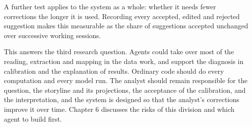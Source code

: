 A further test applies to the system as a whole: whether it needs fewer corrections the longer it is used.
Recording every accepted, edited and rejected suggestion makes this measurable as the share of suggestions accepted unchanged over successive working sessions.

This answers the third research question.
Agents could take over most of the reading, extraction and mapping in the data work, and support the diagnosis in calibration and the explanation of results.
Ordinary code should do every computation and every model run.
The analyst should remain responsible for the question, the storyline and its projections, the acceptance of the calibration, and the interpretation, and the system is designed so that the analyst's corrections improve it over time.
Chapter 6 discusses the risks of this division and which agent to build first.
